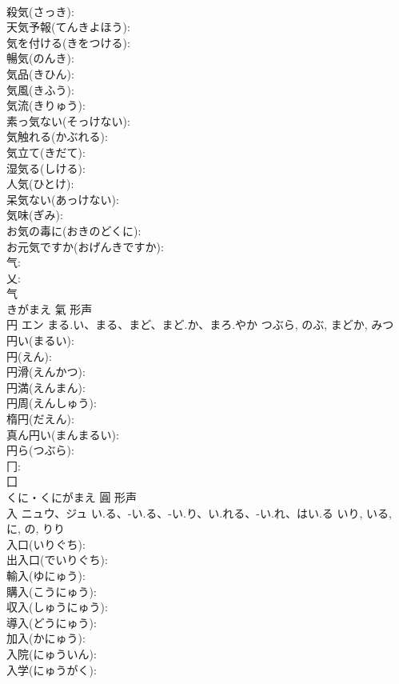 \documentclass[8pt]{extreport}
\begin{document}
\begin{CJK}{UTF8}{min}
\\	殺気(さっき): 
\\	天気予報(てんきよほう): 
\\	気を付ける(きをつける): 
\\	暢気(のんき): 
\\	気品(きひん): 
\\	気風(きふう): 
\\	気流(きりゅう): 
\\	素っ気ない(そっけない): 
\\	気触れる(かぶれる): 
\\	気立て(きだて): 
\\	湿気る(しける): 
\\	人気(ひとけ): 
\\	呆気ない(あっけない): 
\\	気味(ぎみ): 
\\	お気の毒に(おきのどくに): 
\\	お元気ですか(おげんきですか): 
\\	气: 
\\	乂: 
\\	气	
\\	きがまえ	氣	形声 
\\	円	エン	まる.い、まる、まど、まど.か、まろ.やか	つぶら, のぶ, まどか, みつ	
\\	円い(まるい): 
\\	円(えん): 
\\	円滑(えんかつ): 
\\	円満(えんまん): 
\\	円周(えんしゅう): 
\\	楕円(だえん): 
\\	真ん円い(まんまるい): 
\\	円ら(つぶら): 
\\	冂: 
\\	囗	
\\	くに・くにがまえ	圓	形声 
\\	入	ニュウ、ジュ	い.る、-い.る、-い.り、い.れる、-い.れ、はい.る	いり, いる, に, の, りり	
\\	入口(いりぐち): 
\\	出入口(でいりぐち): 
\\	輸入(ゆにゅう): 
\\	購入(こうにゅう): 
\\	収入(しゅうにゅう): 
\\	導入(どうにゅう): 
\\	加入(かにゅう): 
\\	入院(にゅういん): 
\\	入学(にゅうがく): 

\end{CJK}
\end{document}
